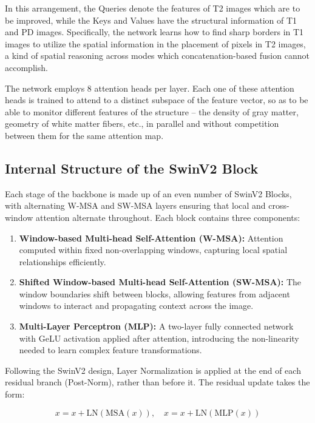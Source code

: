 In this arrangement, the Queries denote the features of T2 images which are to be improved, while the Keys and Values have the structural information of T1 and PD images. Specifically, the network learns how to find sharp borders in T1 images to utilize the spatial information in the placement of pixels in T2 images, a kind of spatial reasoning across modes which concatenation-based fusion cannot accomplish.

The network employs 8 attention heads per layer. Each one of these attention heads is trained to attend to a distinct subspace of the feature vector, so as to be able to monitor different features of the structure – the density of gray matter, geometry of white matter fibers, etc., in parallel and without competition between them for the same attention map.

\subsection{Internal Structure of the SwinV2 Block}
Each stage of the backbone is made up of an even number of SwinV2 Blocks, with alternating W-MSA and SW-MSA layers ensuring that local and cross-window attention alternate throughout. Each block contains three components:

\begin{enumerate}
    \item \textbf{Window-based Multi-head Self-Attention (W-MSA):} Attention computed within fixed non-overlapping windows, capturing local spatial relationships efficiently.
    \item \textbf{Shifted Window-based Multi-head Self-Attention (SW-MSA):} The window boundaries shift between blocks, allowing features from adjacent windows to interact and propagating context across the image.
    \item \textbf{Multi-Layer Perceptron (MLP):} A two-layer fully connected network with GeLU activation applied after attention, introducing the non-linearity needed to learn complex feature transformations.
\end{enumerate}

Following the SwinV2 design, Layer Normalization is applied at the end of each residual branch (Post-Norm), rather than before it. The residual update takes the form:

\begin{equation}
    x = x + \text{LN}(\text{MSA}(x)), \quad x = x + \text{LN}(\text{MLP}(x))
\end{equation}


